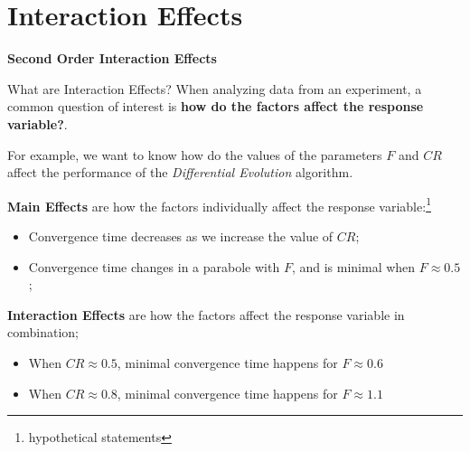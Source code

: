 \section{Interaction Effects}

\begin{frame}{}

  \begin{center}
    {\large {\bf
        Second Order Interaction Effects
    }}
  \end{center}
  
\end{frame}

\begin{frame}[t]{What are Interaction Effects?}{}
  When analyzing data from an experiment, a common question of
  interest is {\bf how do the factors affect the response variable?}.\bigskip

  For example, we want to know how do the values of the parameters $F$
  and $CR$ affect the performance of the \emph{Differential Evolution}
  algorithm.\bigskip

  {\bf Main Effects} are how the factors individually affect the
  response variable:\footnote{hypothetical statements}
  \begin{itemize}
  \item Convergence time decreases as we increase the value of $CR$;
  \item Convergence time changes in a parabole with $F$, and is minimal when
    $F \approx 0.5$;
  \end{itemize}
  {\bf Interaction Effects} are how the factors affect the response
  variable in combination;
  \begin{itemize}
  \item When $CR \approx 0.5$, minimal convergence time happens for $F \approx 0.6$
  \item When $CR \approx 0.8$, minimal convergence time happens for $F \approx 1.1$
  \end{itemize}
\end{frame}

